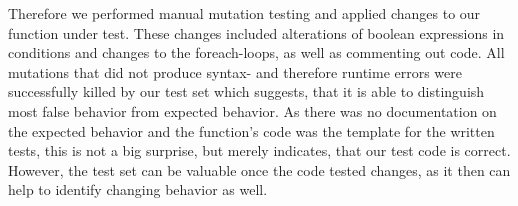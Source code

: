 Therefore we performed manual mutation testing and applied changes to our function under test.
These changes included alterations of boolean expressions in conditions and changes to the foreach-loops, as well as commenting out code.
All mutations that did not produce syntax- and therefore runtime errors were successfully killed by our test set which suggests, that it is able to distinguish most false behavior from expected behavior.
As there was no documentation on the expected behavior and the function's code was the template for the written tests, this is not a big surprise, but merely indicates, that our test code is correct.
However, the test set can be valuable once the code tested changes, as it then can help to identify changing behavior as well.
